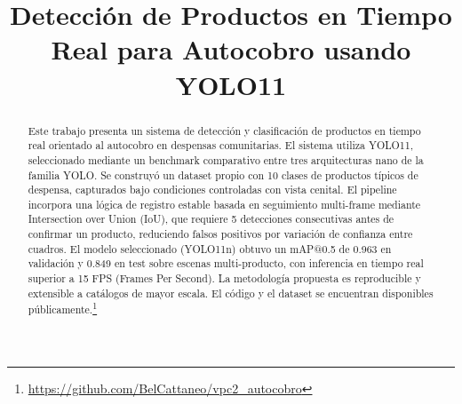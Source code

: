\documentclass[conference,a4paper]{IEEEtran}[2015/08/26]
\begin{document}

\title{Detección de Productos en Tiempo Real para Autocobro usando YOLO11}

\author{%
}


\maketitle

%
%

\begin{abstract}
Este trabajo presenta un sistema de detección y clasificación de productos en tiempo real orientado al autocobro en despensas comunitarias. El sistema utiliza YOLO11, seleccionado mediante un benchmark comparativo entre tres arquitecturas nano de la familia YOLO. Se construyó un dataset propio con 10 clases de productos típicos de despensa, capturados bajo condiciones controladas con vista cenital. El pipeline incorpora una lógica de registro estable basada en seguimiento multi-frame mediante Intersection over Union (IoU), que requiere 5 detecciones consecutivas antes de confirmar un producto, reduciendo falsos positivos por variación de confianza entre cuadros. El modelo seleccionado (YOLO11n) obtuvo un mAP@0.5 de 0.963 en validación y 0.849 en test sobre escenas multi-producto, con inferencia en tiempo real superior a 15 FPS (Frames Per Second). La metodología propuesta es reproducible y extensible a catálogos de mayor escala. El código y el dataset se encuentran disponibles públicamente.\footnote{\url{https://github.com/BelCattaneo/vpc2_autocobro}}
\end{abstract}
\end{document}
